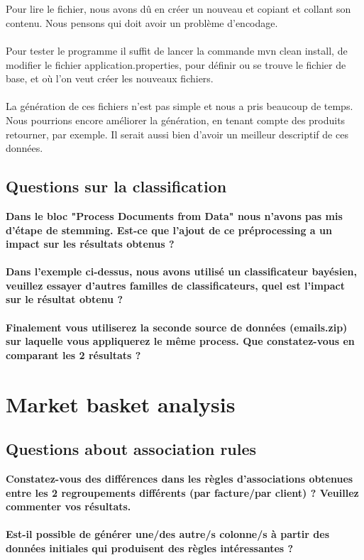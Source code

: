 \documentclass[a4paper]{article}
\begin{document}
\\\\
Pour lire le fichier, nous avons dû en créer un nouveau et copiant et collant son contenu. Nous pensons qui doit avoir un problème d'encodage. 
\\\\
Pour tester le programme il suffit de lancer la commande mvn clean install, de modifier le fichier application.properties, pour définir ou se trouve le fichier de base, et où l'on veut créer les nouveaux fichiers.
\\\\
La génération de ces fichiers n'est pas simple et nous a pris beaucoup de temps. Nous pourrions encore améliorer la génération, en tenant compte des produits retourner, par exemple. Il serait aussi bien d'avoir un meilleur descriptif de ces données.   

\subsection{Questions sur la classification}

\textbf{Dans le bloc "Process Documents from Data" nous n'avons pas mis d'étape de stemming. Est-ce que l'ajout de ce préprocessing a un impact sur les résultats obtenus ?}
\\\\
\textbf{Dans l'exemple ci-dessus, nous avons utilisé un classificateur bayésien, veuillez essayer d'autres familles de classificateurs, quel est l'impact sur le résultat obtenu ?}
\\\\
\textbf{Finalement vous utiliserez la seconde source de données (emails.zip) sur laquelle vous appliquerez le même process. Que constatez-vous en comparant les 2 résultats ?}


\section{Market basket analysis}
\subsection{Questions about association rules}
\textbf{Constatez-vous des différences dans les règles d'associations obtenues entre les 2 regroupements différents (par facture/par client) ? Veuillez commenter vos résultats.}
\\\\
\textbf{Est-il possible de générer une/des autre/s colonne/s à partir des données initiales qui produisent des règles intéressantes ?}
\end{document}
